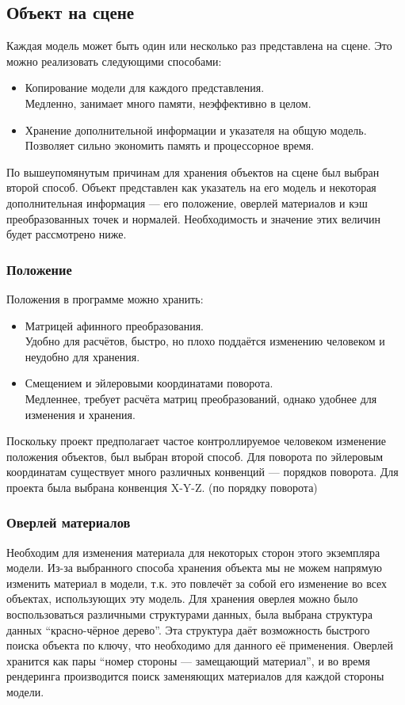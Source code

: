 \documentclass[a4paper,12pt]{report}
\begin{document}
\subsection{Объект на сцене}
Каждая модель может быть один или несколько раз представлена на сцене. Это можно реализовать следующими способами:
\begin{itemize}
\item Копирование модели для каждого представления. \\
Медленно, занимает много памяти, неэффективно в целом.
\item Хранение дополнительной информации и указателя на общую модель. \\
Позволяет сильно экономить память и процессорное время.
\end{itemize}
По вышеупомянутым причинам для хранения объектов на сцене был выбран второй способ. Объект представлен как указатель на его модель и некоторая дополнительная информация --- его положение, оверлей материалов и кэш преобразованных точек и нормалей. Необходимость и значение этих величин будет рассмотрено ниже.

\subsubsection{Положение}
Положения в программе можно хранить:
\begin{itemize}
\item Матрицей афинного преобразования. \\
Удобно для расчётов, быстро, но плохо поддаётся изменению человеком и неудобно для хранения.
\item Смещением и эйлеровыми координатами поворота. \\
Медленнее, требует расчёта матриц преобразований, однако удобнее для изменения и хранения.
\end{itemize}
Поскольку проект предполагает частое контроллируемое человеком изменение положения объектов, был выбран второй способ. Для поворота по эйлеровым координатам существует много различных конвенций --- порядков поворота. Для проекта была выбрана конвенция X-Y-Z. (по порядку поворота)

\subsubsection{Оверлей материалов}
Необходим для изменения материала для некоторых сторон этого экземпляра модели. Из-за выбранного способа хранения объекта мы не можем напрямую изменить материал в модели, т.к. это повлечёт за собой его изменение во всех объектах, использующих эту модель. Для хранения оверлея можно было воспользоваться различными структурами данных, была выбрана структура данных ``красно-чёрное дерево''. Эта структура даёт возможность быстрого поиска объекта по ключу, что необходимо для данного её применения. Оверлей хранится как пары ``номер стороны --- замещающий материал'', и во время рендеринга производится поиск заменяющих материалов для каждой стороны модели.
\end{document}
